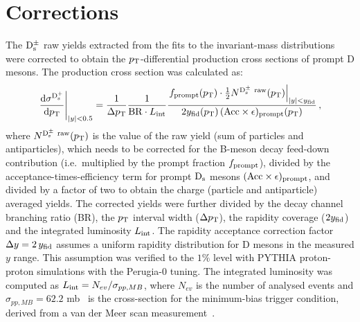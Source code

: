 \section{Corrections}
\label{sec:corrPP}
The ${\rm D_s^{\pm}}$ raw yields extracted from the fits to the invariant-mass distributions
were corrected to obtain the $p_{\rm T}$-differential production cross sections of prompt
 D mesons. The production cross section was calculated as:
\begin{equation}
  \label{eq:dsdpt}
  \left.\frac{{\rm d} \sigma^{\rm D^{+}_{\rm s}}}{{\rm d}p_{\rm T}}\right|_{|y|<0.5}=
  \frac{1}{ \Delta p_{\rm T}}\frac{1}{{\rm BR} \cdot L_{\rm int}}\frac{\left.f_{\rm prompt}(p_{\rm T})\cdot \frac{1}{2} N^{\rm D^\pm_{\rm s}~raw}(p_{\rm T})\right|_{|y|<y_{\rm fid}}}{ 2 y_{\rm fid}(p_{\rm T}) \,({\rm Acc}\times\epsilon)_{\rm prompt}(p_{\rm T})}\,,
\end{equation}
where $N^{\rm D^\pm_{\rm s}~raw}(p_{\rm T})$ is the value of the raw yield 
(sum of particles and antiparticles),
 which needs to be corrected for the B-meson decay feed-down contribution 
(i.e.\ multiplied by the prompt fraction $f_{\rm{prompt}}$), divided by the 
acceptance-times-efficiency term for prompt ${\rm D_s}$ mesons 
$(\rm Acc \times \epsilon)_{\rm{prompt}}$, and divided by a factor of two to 
obtain the charge (particle and antiparticle) averaged yields.
The corrected yields were further divided by the decay channel branching ratio (BR), 
the $p_{\rm T}$ interval width ($\Delta p_{\rm T}$), the rapidity coverage 
($2 y_{\rm fid}$) and the integrated luminosity $L_{\rm int}$.
The rapidity acceptance correction factor $\Delta y=2\,y_{\rm fid}$ assumes
a uniform rapidity  distribution for D mesons in the measured $y$ range.
This assumption was verified to the $1\%$ level with PYTHIA proton-proton simulations 
with the Perugia-0 tuning.
The integrated luminosity was computed as $L_{\rm int} = N_{ev}/\sigma_{pp,MB}$,
where $N_{ev}$ is the number of analysed events and 
$\sigma_{pp,MB} = 62.2$ mb~\cite{Abelev:2012sea}
is the cross-section for the minimum-bias trigger condition, derived from
a van der Meer scan measurement~\cite{vanderMeer:296752}.

